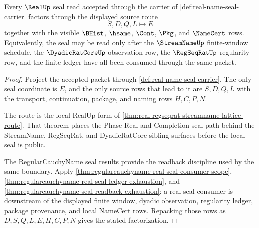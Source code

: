 \begin{theorem}
\label{thm:real-name-seal-source-factorization}
Every $\RealUp$ seal read accepted through the carrier of \autoref{def:real-name-seal-carrier} factors through the displayed source route
$$
S,D,Q,L \longmapsto E
$$
together with the visible $\BHist$, $\hsame$, $\Cont$, $\Pkg$, and $\NameCert$ rows. Equivalently, the seal may be read only after the $\StreamNameUp$ finite-window schedule, the $\DyadicRatCoreUp$ observation row, the $\RegSeqRatUp$ regularity row, and the finite ledger have all been consumed through the same packet.
\end{theorem}
\begin{proof}
Project the accepted packet through \autoref{def:real-name-seal-carrier}. The only seal coordinate is $E$, and the only source rows that lead to it are $S,D,Q,L$ with the transport, continuation, package, and naming rows $H,C,P,N$.

The route is the local RealUp form of \autoref{thm:real-regseqrat-streamname-lattice-route}. That theorem places the Phase Real and Completion seal path behind the StreamName, RegSeqRat, and DyadicRatCore sibling surfaces before the local seal is public.

The RegularCauchyName seal results provide the readback discipline used by the same boundary. Apply \autoref{thm:regularcauchyname-real-seal-consumer-scope}, \autoref{thm:regularcauchyname-real-seal-ledger-exhaustion}, and \autoref{thm:regularcauchyname-seal-readback-exhaustion}: a real-seal consumer is downstream of the displayed finite window, dyadic observation, regularity ledger, package provenance, and local NameCert rows. Repacking those rows as $D,S,Q,L,E,H,C,P,N$ gives the stated factorization.
\end{proof}

